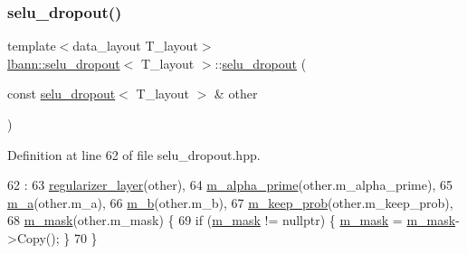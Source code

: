 \subsubsection{\texorpdfstring{selu\+\_\+dropout()}{selu\_dropout()}\hspace{0.1cm}{\footnotesize\ttfamily [2/2]}}
{\footnotesize\ttfamily template$<$data\+\_\+layout T\+\_\+layout$>$ \\
\hyperlink{classlbann_1_1selu__dropout}{lbann\+::selu\+\_\+dropout}$<$ T\+\_\+layout $>$\+::\hyperlink{classlbann_1_1selu__dropout}{selu\+\_\+dropout} (\begin{DoxyParamCaption}\item[{const \hyperlink{classlbann_1_1selu__dropout}{selu\+\_\+dropout}$<$ T\+\_\+layout $>$ \&}]{other }\end{DoxyParamCaption})\hspace{0.3cm}{\ttfamily [inline]}}



Definition at line 62 of file selu\+\_\+dropout.\+hpp.


\begin{DoxyCode}
62                                           :
63     \hyperlink{classlbann_1_1regularizer__layer_a2ebf3877b905b479a0250b74cf8f68b3}{regularizer\_layer}(other),
64     \hyperlink{classlbann_1_1selu__dropout_a8db065b13d8737e1bd4cf154ab3fe666}{m\_alpha\_prime}(other.m\_alpha\_prime),
65     \hyperlink{classlbann_1_1selu__dropout_a52bd21583da68ba4e8a374fab259a3ef}{m\_a}(other.m\_a),
66     \hyperlink{classlbann_1_1selu__dropout_a456fa501b7df6b52701c1aa3639ebc42}{m\_b}(other.m\_b),
67     \hyperlink{classlbann_1_1selu__dropout_a00bd2a07703e2e918af8ae68b58ff11b}{m\_keep\_prob}(other.m\_keep\_prob),
68     \hyperlink{classlbann_1_1selu__dropout_a31aaadbc51d78673a84390b48d4e5950}{m\_mask}(other.m\_mask) \{
69     \textcolor{keywordflow}{if} (\hyperlink{classlbann_1_1selu__dropout_a31aaadbc51d78673a84390b48d4e5950}{m\_mask} != \textcolor{keyword}{nullptr}) \{ \hyperlink{classlbann_1_1selu__dropout_a31aaadbc51d78673a84390b48d4e5950}{m\_mask} = \hyperlink{classlbann_1_1selu__dropout_a31aaadbc51d78673a84390b48d4e5950}{m\_mask}->Copy(); \}
70   \}
\end{DoxyCode}
\mbox{\label{classlbann_1_1selu__dropout_af3cb2d8724ebca49934769be70e40b83}} 
